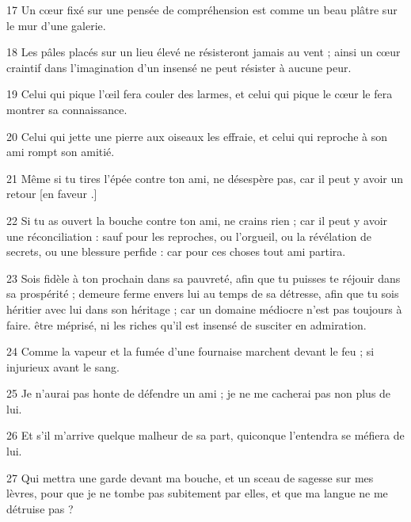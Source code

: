 \par 17 Un cœur fixé sur une pensée de compréhension est comme un beau plâtre sur le mur d'une galerie.
\par 18 Les pâles placés sur un lieu élevé ne résisteront jamais au vent ; ainsi un cœur craintif dans l'imagination d'un insensé ne peut résister à aucune peur.
\par 19 Celui qui pique l'œil fera couler des larmes, et celui qui pique le cœur le fera montrer sa connaissance.
\par 20 Celui qui jette une pierre aux oiseaux les effraie, et celui qui reproche à son ami rompt son amitié.
\par 21 Même si tu tires l'épée contre ton ami, ne désespère pas, car il peut y avoir un retour [en faveur .]
\par 22 Si tu as ouvert la bouche contre ton ami, ne crains rien ; car il peut y avoir une réconciliation : sauf pour les reproches, ou l'orgueil, ou la révélation de secrets, ou une blessure perfide : car pour ces choses tout ami partira.
\par 23 Sois fidèle à ton prochain dans sa pauvreté, afin que tu puisses te réjouir dans sa prospérité ; demeure ferme envers lui au temps de sa détresse, afin que tu sois héritier avec lui dans son héritage ; car un domaine médiocre n'est pas toujours à faire. être méprisé, ni les riches qu'il est insensé de susciter en admiration.
\par 24 Comme la vapeur et la fumée d'une fournaise marchent devant le feu ; si injurieux avant le sang.
\par 25 Je n'aurai pas honte de défendre un ami ; je ne me cacherai pas non plus de lui.
\par 26 Et s'il m'arrive quelque malheur de sa part, quiconque l'entendra se méfiera de lui.
\par 27 Qui mettra une garde devant ma bouche, et un sceau de sagesse sur mes lèvres, pour que je ne tombe pas subitement par elles, et que ma langue ne me détruise pas ?


